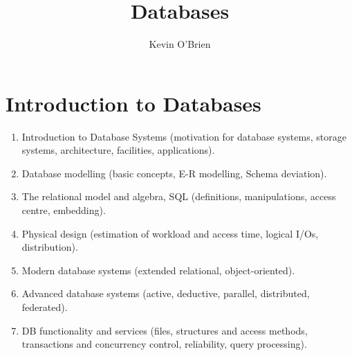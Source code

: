 \documentclass[]{article}
\title{Databases}
\author{Kevin O'Brien}
\begin{document}
\maketitle

\section{Introduction to Databases}


\begin{enumerate}
\item Introduction to Database Systems (motivation for database systems, storage systems, architecture, facilities, applications). 
\item Database modelling (basic concepts, E-R modelling, Schema deviation). 
\item The relational model and algebra, SQL (definitions, manipulations, access centre, embedding). 
\item Physical design (estimation of workload and access time, logical I/Os, distribution). 
\item Modern database systems (extended relational, object-oriented). 
\item Advanced database systems (active, deductive, parallel, distributed, federated). 
\item DB functionality and services (files, structures and access methods, transactions and concurrency control, reliability, query processing).
\end{enumerate}
\end{document}
